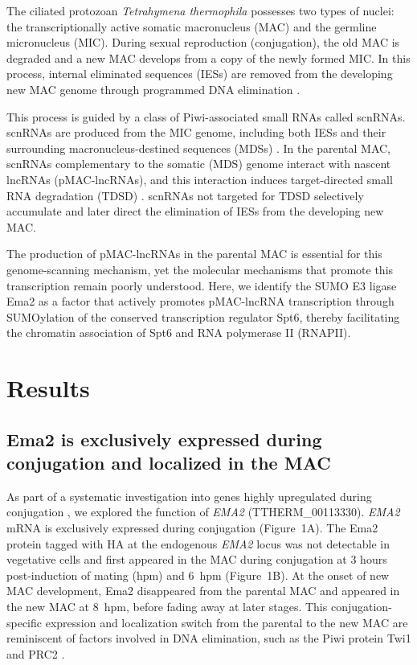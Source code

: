 \documentclass[11pt]{article}
\begin{document}
The ciliated protozoan \textit{Tetrahymena thermophila} possesses two types of nuclei: the transcriptionally active somatic macronucleus (MAC) and the germline micronucleus (MIC). During sexual reproduction (conjugation), the old MAC is degraded and a new MAC develops from a copy of the newly formed MIC. In this process, internal eliminated sequences (IESs) are removed from the developing new MAC genome through programmed DNA elimination \citep{austerberry1984}.

This process is guided by a class of Piwi-associated small RNAs called scnRNAs. scnRNAs are produced from the MIC genome, including both IESs and their surrounding macronucleus-destined sequences (MDSs) \citep{mochizuki2002,schoeberl2012}. In the parental MAC, scnRNAs complementary to the somatic (MDS) genome interact with nascent lncRNAs (pMAC-lncRNAs), and this interaction induces target-directed small RNA degradation (TDSD) \citep{aronica2008,noto2018}. scnRNAs not targeted for TDSD selectively accumulate and later direct the elimination of IESs from the developing new MAC.

The production of pMAC-lncRNAs in the parental MAC is essential for this genome-scanning mechanism, yet the molecular mechanisms that promote this transcription remain poorly understood. Here, we identify the SUMO E3 ligase Ema2 as a factor that actively promotes pMAC-lncRNA transcription through SUMOylation of the conserved transcription regulator Spt6, thereby facilitating the chromatin association of Spt6 and RNA polymerase II (RNAPII).

\section{Results}

\subsection{Ema2 is exclusively expressed during conjugation and localized in the MAC}

As part of a systematic investigation into genes highly upregulated during conjugation \citep{loidl2021}, we explored the function of \textit{EMA2} (TTHERM\_00113330). \textit{EMA2} mRNA is exclusively expressed during conjugation (Figure~1A). The Ema2 protein tagged with HA at the endogenous \textit{EMA2} locus was not detectable in vegetative cells and first appeared in the MAC during conjugation at 3 hours post-induction of mating (hpm) and 6~hpm (Figure~1B). At the onset of new MAC development, Ema2 disappeared from the parental MAC and appeared in the new MAC at 8~hpm, before fading away at later stages. This conjugation-specific expression and localization switch from the parental to the new MAC are reminiscent of factors involved in DNA elimination, such as the Piwi protein Twi1 and PRC2 \citep{mochizuki2002,liu2007,noto2010}.
\end{document}
